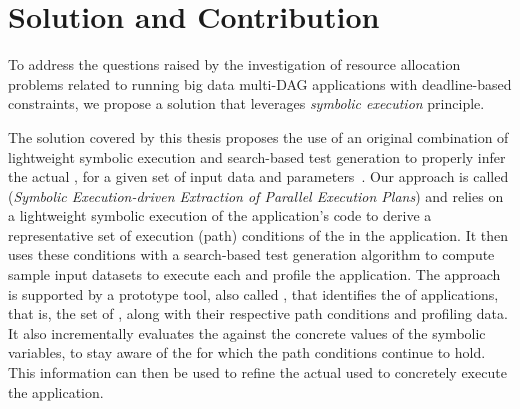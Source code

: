 \section{Solution and Contribution}\label{sec:solution_contribution}
To address the questions raised by the investigation of resource allocation problems related to running big data multi-DAG applications with deadline-based \qos constraints, we propose a solution that leverages \textit{symbolic execution} principle. 





The solution covered by this thesis proposes the use of an original combination of lightweight symbolic execution and search-based test generation to properly infer the actual \plan, for a given set of input data and parameters~\cite{Baresi-Quattrocchi-Denaro:2019}. Our approach is called \dSymb (\textit{Symbolic Execution-driven Extraction of Parallel Execution Plans}) and relies on a lightweight symbolic execution of the application's code to derive a representative set of execution (path) conditions of the \plans in the application. It then uses these conditions with a search-based test generation algorithm to compute sample input datasets to execute each \plan and profile the application. The approach is supported by a prototype tool, also called \dSymb, that identifies the \model of applications, that is, the set of \plans, along with their respective path conditions and profiling data. It also incrementally evaluates the \model against the  concrete values of the symbolic variables, to stay aware of the \plans for which the path conditions continue to hold. This information can then be used to refine the actual \plan used to concretely execute the application. 

